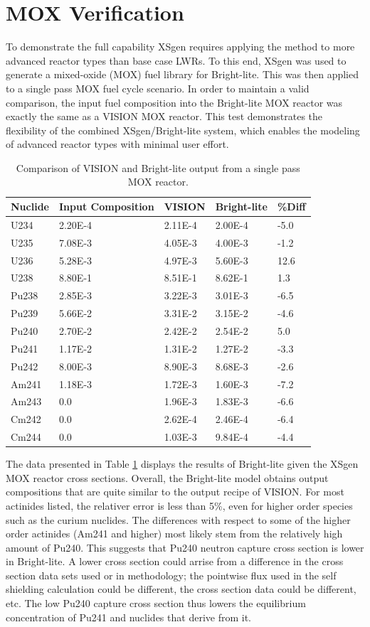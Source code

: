 \documentclass{article}
\begin{document}
\section{MOX Verification}
\label{sec-mox-benchmark}
To demonstrate the full capability XSgen requires applying the method to more advanced
reactor types than base case LWRs. To this end, XSgen was used to generate a mixed-oxide (MOX)
fuel library for Bright-lite. This was then applied to a single pass MOX fuel cycle scenario.
In order to maintain a valid comparison, the input fuel composition into the Bright-lite MOX
reactor was exactly the same as a VISION MOX reactor.
This test demonstrates the flexibility of the combined XSgen/Bright-lite system, which enables
the modeling of advanced reactor types with minimal user effort.

\begin{table}[!htb]
\centering
\caption{Comparison of VISION and Bright-lite output from a single pass MOX reactor.}
\label{tab:g}
\begin{tabular}{lllll}
Nuclide & Input Composition & VISION & Bright-lite & \%Diff \\
\hline
U234 & 2.20E-4 & 2.11E-4 & 2.00E-4 & -5.0\\
U235 & 7.08E-3 & 4.05E-3 & 4.00E-3 & -1.2\\
U236 & 5.28E-3 & 4.97E-3 & 5.60E-3 & 12.6\\
U238 & 8.80E-1 & 8.51E-1 & 8.62E-1 & 1.3\\
Pu238 & 2.85E-3 & 3.22E-3 & 3.01E-3 & -6.5\\
Pu239 & 5.66E-2 & 3.31E-2 & 3.15E-2 & -4.6\\
Pu240 & 2.70E-2 & 2.42E-2 & 2.54E-2 & 5.0\\
Pu241 & 1.17E-2 & 1.31E-2 & 1.27E-2 & -3.3\\
Pu242 & 8.00E-3 & 8.90E-3 & 8.68E-3 & -2.6\\
Am241 & 1.18E-3 & 1.72E-3 & 1.60E-3 & -7.2\\
Am243 & 0.0 & 1.96E-3 & 1.83E-3 & -6.6\\
Cm242 & 0.0 & 2.62E-4 & 2.46E-4 & -6.4\\
Cm244 & 0.0 & 1.03E-3 & 9.84E-4 & -4.4
\end{tabular}
\end{table}

The data presented in Table \ref{tab:g} displays the results of Bright-lite given the XSgen MOX
reactor cross sections. Overall, the Bright-lite model obtains output compositions that
are quite similar to the output recipe of VISION. For most actinides listed, the relativer error
is less than 5\%, even for higher order species such as the curium nuclides.
The differences with respect to some of the higher order actinides (Am241 and higher) most
likely stem from the relatively high amount of Pu240. This suggests that Pu240 neutron capture
cross section is lower in Bright-lite. A lower cross section could arrise from a difference in the cross
section data sets used or in methodology; the pointwise flux used in the self shielding calculation could
be different, the cross section data could be different, etc.
The low Pu240 capture cross section thus lowers the equilibrium concentration of Pu241 and
nuclides that derive from it.
\end{document}
